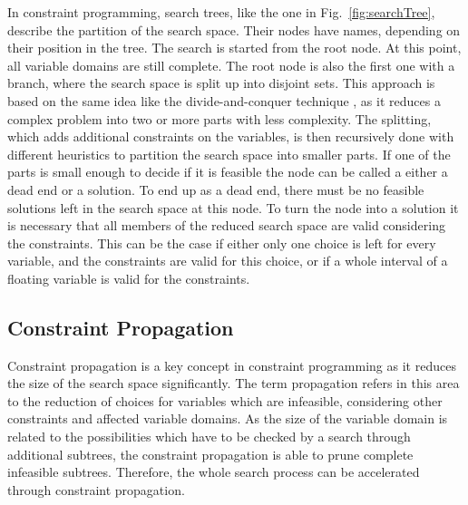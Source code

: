 \documentclass[10pt,
               a4paper,
               journal,
               ]{IEEEtran}
\newcommand{\reffig}[1]{{Fig.~\ref{#1}}}
\begin{document}
	In constraint programming, search trees, like the one in \reffig{fig:searchTree}, describe the partition of the search space. Their nodes have names, depending on their position in the tree. The search is started from the root node. At this point, all variable domains are still complete. The root node is also the first one with a branch, where the search space is split up into disjoint sets. This approach is based on the same idea like the divide-and-conquer technique \cite[p.~175]{artOfComputerProgramming}, as it reduces a complex problem into two or more parts with less complexity. The splitting, which adds additional constraints on the variables, is then recursively done with different heuristics to partition the search space into smaller parts. If one of the parts is small enough to decide if it is feasible the node can be called a either a dead end or a solution. To end up as a dead end, there must be no feasible solutions left in the search space at this node. To turn the node into a solution it is necessary that all members of the reduced search space are valid considering the constraints. This can be the case if either only one choice is left for every variable, and the constraints are valid for this choice, or if a whole interval of a floating variable is valid for the constraints.
	
	\subsection{Constraint Propagation}
	Constraint propagation is a key concept in constraint programming as it reduces the size of the search space significantly. The term propagation refers in this area to the reduction of choices for variables which are infeasible, considering other constraints and affected variable domains. As the size of the variable domain is related to the possibilities which have to be checked by a search through additional subtrees, the constraint propagation is able to prune complete infeasible subtrees. Therefore, the whole search process can be accelerated through constraint propagation.
	
\end{document}
